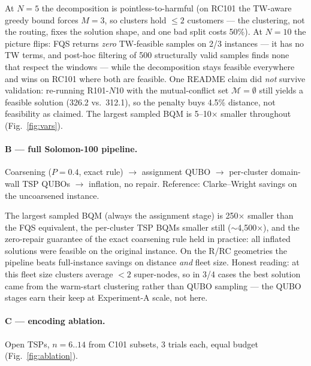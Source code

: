 \documentclass[10pt,a4paper]{article}
\begin{document}
At $N=5$ the decomposition is pointless-to-harmful (on RC101 the TW-aware
greedy bound forces $M=3$, so clusters hold $\le 2$ customers --- the
clustering, not the routing, fixes the solution shape, and one bad split
costs 50\%). At $N=10$ the picture flips: FQS returns \emph{zero} TW-feasible
samples on 2/3 instances --- it has no TW terms, and post-hoc filtering of
500 structurally valid samples finds none that respect the windows --- while
the decomposition stays feasible everywhere and wins on RC101 where both are
feasible. One README claim did \emph{not} survive validation: re-running
R101-$N$10 with the mutual-conflict set $\mathcal{M}=\emptyset$ still yields
a feasible solution (326.2 vs.\ 312.1), so the penalty buys 4.5\% distance,
not feasibility as claimed. The largest sampled BQM is 5--10$\times$ smaller
throughout (Fig.~\ref{fig:vars}).

\paragraph{B --- full Solomon-100 pipeline.} Coarsening ($P=0.4$, exact rule)
$\to$ assignment QUBO $\to$ per-cluster domain-wall TSP QUBOs $\to$ inflation,
no repair. Reference: Clarke--Wright savings on the uncoarsened instance.

\begin{table}[h]\centering\small
\caption{Experiment B. \emph{FQS-equiv} = variables the monolithic formulation
would need ($MN^2$); best solutions are fully TW/capacity-feasible in all four
cases (no repair).}
\label{tab:expB}

\end{table}

The largest sampled BQM (always the assignment stage) is 250$\times$ smaller
than the FQS equivalent, the per-cluster TSP BQMs smaller still
($\sim$4{,}500$\times$), and
the zero-repair guarantee of the exact coarsening rule held in practice: all
inflated solutions were feasible on the original instance. On the R/RC
geometries the pipeline beats full-instance savings on distance \emph{and}
fleet size. Honest reading: at this fleet size clusters average $<2$
super-nodes, so in 3/4 cases the best solution came from the warm-start
clustering rather than QUBO sampling --- the QUBO stages earn their keep at
Experiment-A scale, not here.

\paragraph{C --- encoding ablation.} Open TSPs, $n=6..14$ from C101 subsets,
3 trials each, equal budget (Fig.~\ref{fig:ablation}).
\end{document}
